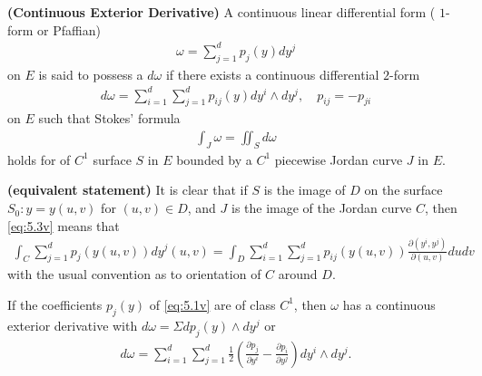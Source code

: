 \documentclass{article}
\newcommand{\bfs}[1]{\textbf{({#1}) }}
\begin{document}
\begin{defa}\bfs{Continuous Exterior Derivative} 
A continuous linear differential form ( $1$-form or Pfaffian)
\begin{align}
\omega=\sum_{j=1}^{d} p_{j}(y) d y^{j}\label{eq:5.1v}
\end{align}
on $E$ is said to possess a  $d\omega$ if there exists a continuous differential $2$-form
\begin{align}
d \omega=\sum_{i=1}^{d} \sum_{j=1}^{d} p_{i j}(y) d y^{i} \wedge d y^{j}, \quad p_{i j}=-p_{ji}\label{eq:5.2v}
\end{align}
on $E$ such that Stokes' formula
\begin{align}
\int_{J} \omega=\iint_{S} d \omega\label{eq:5.3v}
\end{align}
holds for  of $C^{1}$ surface $S$ in $E$ bounded by a $C^{1}$ piecewise Jordan curve $J$ in $E$.
\end{defa}
\begin{rema}\bfs{equivalent statement}
It is clear that if $S$ is the image of $D$ on the surface $S_{0}: y=y(u, v)$ for $(u, v) \in D$, and $J$ is the image of the Jordan curve $C$, then \cref{eq:5.3v} means that 
\begin{align}
    \int_{C} \sum_{j=1}^{d} p_{j}(y(u, v)) d y^{j}(u, v)=\int_{D} \sum_{i=1}^{d} \sum_{j=1}^{d} p_{i j}(y(u, v)) \frac{\partial\left(y^{i}, y^{j}\right)}{\partial(u, v)} d u d v \label{eq:5.4v}
\end{align} with the usual convention as to orientation of $C$ around $D$.
\end{rema}


\begin{exma}
If the coefficients $p_{j}(y)$ of \cref{eq:5.1v} are of class $C^{1}$, then $\omega$ has a continuous exterior derivative with $d \omega=\Sigma d p_{j}(y) \wedge d y^{j}$ or
\begin{align*}
d \omega=\sum_{i=1}^{d} \sum_{j=1}^{d} \frac{1}{2}\left(\frac{\partial p_{j}}{\partial y^{i}}-\frac{\partial p_{i}}{\partial y^{j}}\right) d y^{i} \wedge d y^{j} .
\end{align*}
\end{exma}

\end{document}
